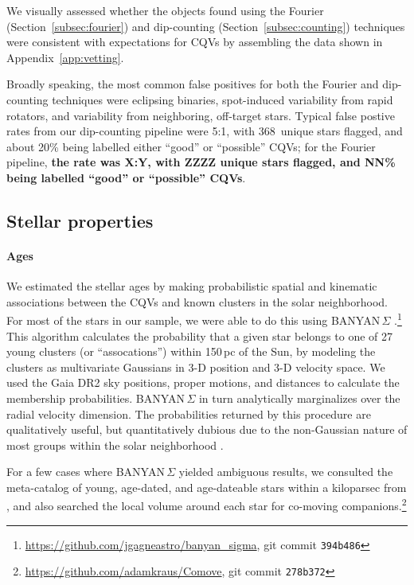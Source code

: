 \documentclass[11pt,twocolumn,tighten]{aastex63}
\newcommand{\nuniqdipflagged}{{368}} %
\begin{document}
We visually assessed whether the objects found using the Fourier
(Section~\ref{subsec:fourier}) and dip-counting
(Section~\ref{subsec:counting}) techniques were consistent with
expectations for CQVs by assembling the data shown in
Appendix~\ref{app:vetting}.

Broadly speaking, the most common false positives for both the Fourier
and dip-counting techniques were eclipsing binaries, spot-induced
variability from rapid rotators, and variability from neighboring,
off-target stars.  Typical false postive rates from our dip-counting
pipeline were 5:1, with \nuniqdipflagged\ unique stars flagged, and
about 20\% being labelled either ``good'' or ``possible'' CQVs; for
the Fourier pipeline, {\bf the rate was X:Y, with ZZZZ unique stars
flagged, and NN\% being labelled ``good'' or ``possible'' CQVs}.


\subsection{Stellar properties}

\paragraph{Ages}
We estimated the stellar ages by making probabilistic spatial and
kinematic associations between the CQVs and known clusters in the
solar neighborhood.  For most of the stars in our sample, we were able
to do this using BANYAN\,$\Sigma$
\citep{2018ApJ...856...23G}.\footnote{\url{https://github.com/jgagneastro/banyan_sigma},
git commit \texttt{394b486}} This algorithm calculates the probability
that a given star belongs to one of 27 young clusters (or
``assocations'') within 150\,pc of the Sun, by modeling the clusters
as multivariate Gaussians in 3-D position and 3-D velocity space.  We
used the Gaia DR2 sky positions, proper motions, and distances to
calculate the membership probabilities.  BANYAN\,$\Sigma$ in turn
analytically marginalizes over the radial velocity dimension.  The
probabilities returned by this procedure are qualitatively useful, but
quantitatively dubious due to the non-Gaussian nature of most groups
within the solar neighborhood \citep[see
e.g.][Figure~10]{2021ApJ...917...23K}.

For a few cases where BANYAN\,$\Sigma$ yielded ambiguous results, we
consulted the meta-catalog of young, age-dated, and age-dateable stars
within a kiloparsec from \citet{2022AJ....163..121B}, and also
searched the local volume around each star for co-moving
companions.\footnote{\url{https://github.com/adamkraus/Comove}, git
commit \texttt{278b372}}
\end{document}
